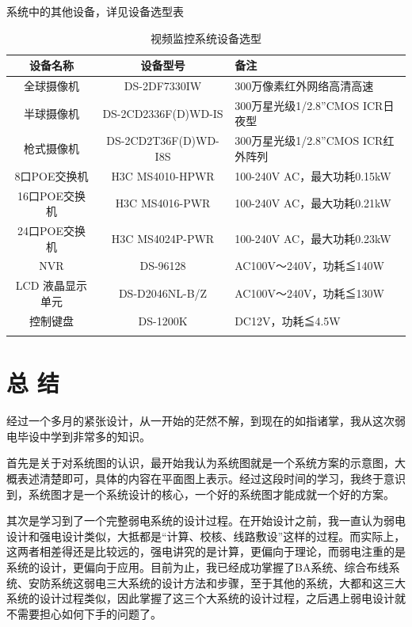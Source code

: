 \documentclass{gdutart}
\begin{document}
      系统中的其他设备，详见设备选型表

      \begin{table}[htpb]
        \begin{center}
          \caption{视频监控系统设备选型}\label{tab:tab19}
          \begin{tabularx}{\linewidth}{c|c|Y}
            \Xhline{1.5pt}
            设备名称 & 设备型号 & 备注 \\
            \hline
            全球摄像机 & DS-2DF7330IW & 300万像素红外网络高清高速 \\
            \hline
            半球摄像机 & DS-2CD2336F(D)WD-IS & 300万星光级1/2.8”CMOS ICR日夜型 \\
            \hline
            枪式摄像机 & DS-2CD2T36F(D)WD-I8S & 300万星光级1/2.8”CMOS ICR红外阵列 \\
            \hline
            8口POE交换机 & H3C MS4010-HPWR & 100-240V AC，最大功耗0.15kW \\
            \hline
            16口POE交换机 & H3C MS4016-PWR & 100-240V AC，最大功耗0.21kW \\
            \hline
            24口POE交换机 & H3C MS4024P-PWR & 100-240V AC，最大功耗0.23kW \\
            \hline
            NVR & DS-96128 &  AC100V～240V，功耗≦140W \\
            \hline
            LCD 液晶显示单元 & DS-D2046NL-B/Z &   AC100V～240V，功耗≦130W \\
            \hline
            控制键盘 & DS-1200K & DC12V，功耗≦4.5W \\
            \Xhline{1.5pt}
          \end{tabularx}
        \end{center}
      \end{table} \clearpage

  \section*{总 \quad 结}
  经过一个多月的紧张设计，从一开始的茫然不解，到现在的如指诸掌，我从这次弱电毕设中学到非常多的知识。

  首先是关于对系统图的认识，最开始我认为系统图就是一个系统方案的示意图，大概表述清楚即可，具体的内容在平面图上表示。经过这段时间的学习，我终于意识到，系统图才是一个系统设计的核心，一个好的系统图才能成就一个好的方案。

  其次是学习到了一个完整弱电系统的设计过程。在开始设计之前，我一直认为弱电设计和强电设计类似，大抵都是“计算、校核、线路敷设”这样的过程。而实际上，这两者相差得还是比较远的，强电讲究的是计算，更偏向于理论，而弱电注重的是系统的设计，更偏向于应用。目前为止，我已经成功掌握了BA系统、综合布线系统、安防系统这弱电三大系统的设计方法和步骤，至于其他的系统，大都和这三大系统的设计过程类似，因此掌握了这三个大系统的设计过程，之后遇上弱电设计就不需要担心如何下手的问题了。
\end{document}
